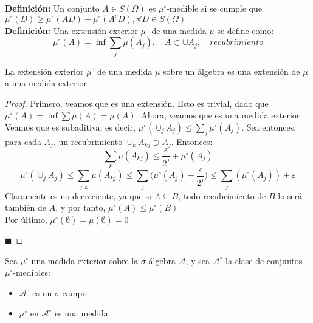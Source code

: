 \documentclass[12pt,a4paper]{book}
\newcommand*{\qed}{\hfill\ensuremath{\blacksquare}}
\begin{document}
\textbf{Definición:} Un conjunto $A\in S(\Omega)$ es $\mu^\circ$-medible si se cumple que $\mu^\circ(D) \geq \mu^\circ(AD)+\mu^\circ(A^cD), \forall D \in S(\Omega)$\\

\textbf{Definición:} Una extensión exterior $\mu^\circ$ de una medida $\mu$ se define como:
$$\mu^\circ (A) = \inf \sum_j \mu(A_j), \quad A \subset \cup A_j,\quad recubrimiento $$

\begin{theorem}
La extensión exterior $\mu^\circ$ de una medida $\mu$ sobre un álgebra es una extensión de $\mu$ a una medida exterior
\end{theorem}

\begin{proof}
Primero, veamos que es una extensión. Esto es trivial, dado que $\mu^\circ(A) = \inf \displaystyle \sum \mu(A) = \mu(A)$. Ahora, veamos que es una medida exterior.\\

Veamos que es subaditiva, es decir, $\mu^\circ(\displaystyle \cup_j A_j) \leq \sum_j \mu^\circ(A_j)$. Sea entonces, para cada $A_j$, un recubrimiento $ \displaystyle \cup_k A_{kj} \supset A_j$. Entonces:
$$ \sum_k \mu (A_{kj}) \leq \frac{\varepsilon}{2^j} + \mu^\circ (A_j)$$
$$ \mu^\circ (\cup_j A_j) \leq \sum_{j,k} \mu (A_{kj}) \leq \sum_j \Big( \mu^\circ(A_j) + \frac{\varepsilon}{2^j}\Big) \leq \sum_j (\mu^\circ(A_j)) + \varepsilon $$
Claramente es no decreciente, ya que si $A \subseteq B$, todo recubrimiento de $B$ lo será también de $A$, y por tanto, $\mu^\circ(A) \leq \mu^\circ(B)$\\

Por último, $\mu^\circ(\emptyset) = \mu(\emptyset) = 0$

\qed
\end{proof}

\begin{theorem}
Sea $\mu^\circ$ una medida exterior sobre la $\sigma$-álgebra $\mathcal{A}$, y sea $\mathcal{A}^\circ$ la clase de conjuntos $\mu^\circ$-medibles:
\begin{itemize}
\item $\mathcal{A}^\circ$ es un $\sigma$-campo
\item $\mu^\circ$ en $\mathcal{A}^\circ$ es una medida
\end{itemize}
\end{theorem}
\end{document}
